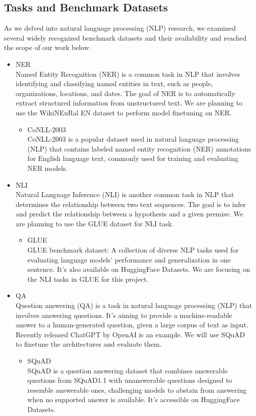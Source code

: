 \documentclass{article}
\begin{document}
\subsection{Tasks and Benchmark Datasets}
As we delved into natural language processing (NLP) research, we examined several widely recognized benchmark datasets and their availability and reached the scope of our work below. 
\begin{itemize}
    \item NER \\
    Named Entity Recognition (NER) is a common task in NLP that involves identifying and classifying named entities in text, such as people, organizations, locations, and dates. The goal of NER is to automatically extract structured information from unstructured text. We are planning to use the WikiNEuRal EN dataset to perform model finetuning on NER.
        \begin{itemize}
            \item CoNLL-2003\\
            CoNLL-2003 is a popular dataset used in natural language processing (NLP) that contains labeled named entity recognition (NER) annotations for English language text, commonly used for training and evaluating NER models.
        \end{itemize}
    \item NLI \\
    Natural Language Inference (NLI) is another common task in NLP that determines the relationship between two text sequences. The goal is to infer and predict the relationship between a hypothesis and a given premise. We are planning to use the GLUE dataset for NLI task.
            \begin{itemize}
            \item GLUE\\
            GLUE benchmark dataset: A collection of diverse NLP tasks used for evaluating language models' performance and generalization in one sentence. It's also available on HuggingFace Datasets. We are focusing on the NLI tasks in GLUE for this project. 
        \end{itemize}
    \item QA \\
    Question answering (QA) is a task in natural language processing (NLP) that involves answering questions. It's aiming to provide a machine-readable answer to a human-generated question, given a large corpus of text as input. Recently released ChatGPT by OpenAI is an example. We will use SQuAD to finetune the architectures and evaluate them.
            \begin{itemize}
            \item SQuAD\\
            SQuAD is a question answering dataset that combines answerable questions from SQuAD1.1 with unanswerable questions designed to resemble answerable ones, challenging models to abstain from answering when no supported answer is available. It's accessible on HuggingFace Datasets.
        \end{itemize}
\end{itemize}
\end{document}
